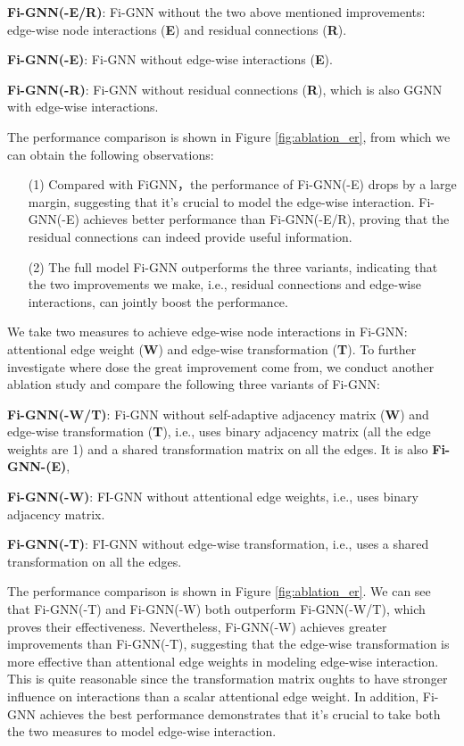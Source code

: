 \documentclass[sigconf]{acmart}
\begin{document}
\textbf{Fi-GNN(-E/R)}:
Fi-GNN without the two above mentioned improvements: edge-wise node interactions (\textbf{E}) and residual connections (\textbf{R}).

\textbf{Fi-GNN(-E)}:
Fi-GNN without edge-wise interactions (\textbf{E}).

\textbf{Fi-GNN(-R)}:
Fi-GNN without residual connections (\textbf{R}), which is also GGNN with edge-wise interactions. 

The performance comparison is shown in Figure \ref{fig:ablation_er}, from which we can obtain the following observations:
\begin{itemize}
\item[(1)]
Compared with FiGNN，the performance of Fi-GNN(-E) drops by a large margin, suggesting that it's crucial to model the edge-wise interaction.
Fi-GNN(-E) achieves better performance than Fi-GNN(-E/R), proving that the residual connections can indeed provide useful information. 
\item[(2)]
The full model Fi-GNN outperforms the three variants, indicating that the two improvements we make, i.e., residual connections and edge-wise interactions, can jointly boost the performance.
\end{itemize}




We take two measures to achieve edge-wise node interactions in Fi-GNN: attentional edge weight (\textbf{W}) and edge-wise transformation (\textbf{T}).
To further investigate where dose the great improvement come from, we conduct another ablation study and compare the following three variants of Fi-GNN:

\textbf{Fi-GNN(-W/T)}: Fi-GNN without self-adaptive adjacency matrix (\textbf{W}) and edge-wise transformation (\textbf{T}), i.e., uses binary adjacency matrix (all the edge weights are 1) and a shared transformation matrix on all the edges.
It is also \textbf{Fi-GNN-(E)},

\textbf{Fi-GNN(-W)}: FI-GNN without attentional edge weights, i.e., uses binary adjacency matrix.

\textbf{Fi-GNN(-T)}: FI-GNN without edge-wise transformation,
i.e., uses a shared transformation on all the edges. 

The performance comparison is shown in Figure \ref{fig:ablation_er}.
We can see that Fi-GNN(-T) and Fi-GNN(-W) both outperform Fi-GNN(-W/T), which proves their effectiveness.
Nevertheless, Fi-GNN(-W) achieves greater improvements than Fi-GNN(-T), suggesting that the edge-wise transformation is more effective than attentional edge weights in modeling edge-wise interaction.
This is quite reasonable since the transformation matrix oughts to have stronger influence on interactions than a scalar attentional edge weight.
In addition, Fi-GNN achieves the best performance demonstrates that it's crucial to take both the two measures to model edge-wise interaction.
\end{document}
